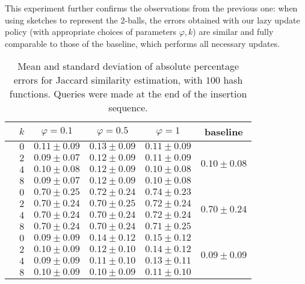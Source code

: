 This experiment further confirms the observations from the previous one: when using sketches to represent the $2$-balls, the errors obtained with our lazy update policy (with appropriate choices of parameters $\varphi,k$) are similar and fully comparable to those of the baseline, which performs all necessary updates.

\begin{table}[h]
    \centering
    \caption{Mean and standard deviation of absolute percentage errors for Jaccard similarity estimation, with $100$ hash functions. Queries were made at the end of the insertion sequence.}
    \begin{tabular}{lc|ccc|c}
    \toprule
        & $k$ & $\varphi = 0.1$ & $\varphi = 0.5$ & $\varphi = 1$ & baseline\\
    \midrule

        \parbox[t]{2mm}{}

        & $0$ & $0.11 \pm 0.09$ & $0.13 \pm 0.09$ & $0.11 \pm 0.09$ &  \\
        & $2$ & $0.09 \pm 0.07$ & $0.12 \pm 0.09$ & $0.11 \pm 0.09$ & \\
        & $4$ & $0.10 \pm 0.08$ & $0.12 \pm 0.09$ & $0.10 \pm 0.08$ & \\
        & $8$ & $0.09 \pm 0.07$ & $0.12 \pm 0.09$ & $0.10 \pm 0.08$ & \\

        \midrule[.66pt]

        \parbox[t]{2mm}{}

        & $0$ & $0.70 \pm 0.25$ & $0.72 \pm 0.24$ & $0.74 \pm 0.23$ &  \\
        & $2$ & $0.70 \pm 0.24$ & $0.70 \pm 0.25$ & $0.72 \pm 0.24$ & \\
        & $4$ & $0.70 \pm 0.24$ & $0.70 \pm 0.24$ & $0.72 \pm 0.24$ & \\
        & $8$ & $0.70 \pm 0.24$ & $0.70 \pm 0.24$ & $0.71 \pm 0.25$ & \\

        \midrule[.66pt]

        \parbox[t]{2mm}{}

        & $0$ & $0.09 \pm 0.09$ & $0.14 \pm 0.12$ & $0.15 \pm 0.12$ &  \\
        & $2$ & $0.10 \pm 0.09$ & $0.12 \pm 0.10$ & $0.14 \pm 0.12$ & \\
        & $4$ & $0.09 \pm 0.09$ & $0.11 \pm 0.10$ & $0.13 \pm 0.11$ & \\
        & $8$ & $0.10 \pm 0.09$ & $0.10 \pm 0.09$ & $0.11 \pm 0.10$ & \\


\end{tabular}
\end{table}
